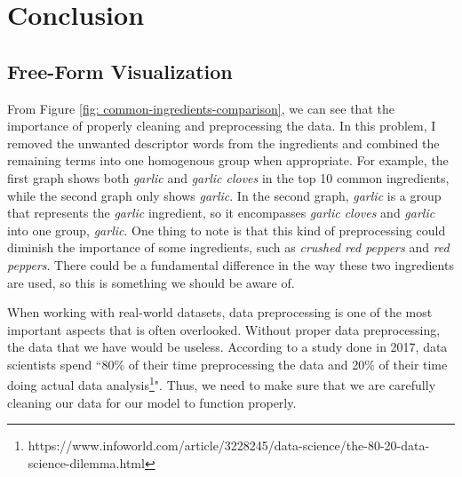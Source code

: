 \documentclass[12pt]{article}
\begin{document}
\section{Conclusion}
\subsection{Free-Form Visualization}

From Figure \ref{fig: common-ingredients-comparison}, we can see that the importance of properly cleaning and preprocessing the data. In this problem, I removed the unwanted descriptor words from the ingredients and combined the remaining terms into one homogenous group when appropriate. For example, the first graph shows both \textit{garlic} and \textit{garlic cloves} in the top 10 common ingredients, while the second graph only shows \textit{garlic}. In the second graph, \textit{garlic} is a group that represents the \textit{garlic} ingredient, so it encompasses \textit{garlic cloves} and \textit{garlic} into one group, \textit{garlic}. One thing to note is that this kind of preprocessing could diminish the importance of some ingredients, such as \textit{crushed red peppers} and \textit{red peppers}. There could be a fundamental difference in the way these two ingredients are used, so this is something we should be aware of.

When working with real-world datasets, data preprocessing is one of the most important aspects that is often overlooked. Without proper data preprocessing, the data that we have would be useless. According to a study done in 2017, data scientists spend ``80\% of their time preprocessing the data and 20\% of their time doing actual data analysis\footnote{https://www.infoworld.com/article/3228245/data-science/the-80-20-data-science-dilemma.html}". Thus, we need to make sure that we are carefully cleaning our data for our model to function properly.
\end{document}
